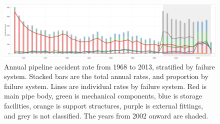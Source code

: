 \documentclass[letterpaper,10pt,oneside,final,onecolumn]{article}
\begin{document}
	\begin{figure}
		\centering
		\includegraphics[keepaspectratio=true,scale=0.24]{../images/AccidentsYearCrop.png}
		\caption{Annual pipeline accident rate from 1968 to 2013, stratified by failure system. 
			Stacked bars are the total annual rates, and proportion by failure system. 
			Lines are individual rates by failure system. Red is main pipe body, green is mechanical components, blue is storage facilities, orange is support structures, purple is external fittings, and grey is not classified. 
			The years from 2002 onward are shaded.
		}\label{accidents-year}
	\end{figure}
\end{document}
